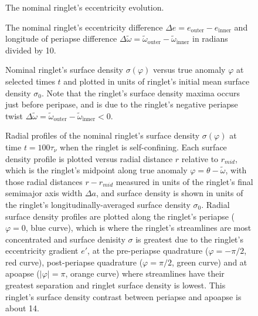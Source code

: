 \documentclass[preprint]{aastex62}
\begin{document}
\begin{figure}
    \caption{
        \label{fig:e_nominal}
        The nominal ringlet's eccentricity evolution.
    }
\end{figure}

\begin{figure}
    \caption{
        \label{fig:de_nominal}
        The nominal ringlet's eccentricity difference $\Delta e = e_{\text{outer}} - e_{\text{inner}}$
        and longitude of periapse difference
        $\Delta\tilde{\omega} = \tilde{\omega}_{\text{outer}} - \tilde{\omega}_{\text{inner}}$
        in radians divided by 10.
    }
\end{figure}

\begin{figure}
    \caption{
        \label{fig:nominal_sigma_vs_longitude}
        Nominal ringlet's surface density $\sigma(\varphi)$ versus true anomaly 
        $\varphi$ at selected times $t$ and plotted in units of ringlet's initial
        mean surface density $\sigma_0$. Note that the ringlet's surface
        density maxima occurs just before peripase,  and is due to the ringlet's
        negative periapse twist 
        $\Delta\tilde{\omega} = \tilde{\omega}_{\text{outer}} - \tilde{\omega}_{\text{inner}} < 0$.
    }
\end{figure}

\begin{figure}
    \caption{
        \label{fig:radial_sigma_nominal}
        Radial profiles of the nominal ringlet's surface density $\sigma(\varphi)$ at time $t=100\tau_\nu$
        when the ringlet is self-confining. Each surface density profile is plotted versus radial distance $r$ 
        relative to $r_{mid}$, which is the ringlet's midpoint along true anomaly $\varphi = \theta-\tilde{\omega}$,
        with those radial distances $r - r_{mid}$ measured in units of the ringlet's final semimajor axis width $\Delta a$,
        and surface density is shown in units of the ringlet's longitudinally-averaged surface density $\sigma_0$.
        Radial surface density profiles are plotted along the ringlet's periapse ($\varphi=0$, blue curve), which is 
        where the ringlet's streamlines are most concentrated and surface denisity $\sigma$ is
        greatest due to the ringlet's eccentricity gradient $e'$, at the pre-periapse
        quadrature ($\varphi=-\pi/2$, red curve), post-periapse
        quadrature ($\varphi=\pi/2$, green curve)
        and at apoapse ($|\varphi|=\pi$, orange curve) where streamlines have their greatest separation
        and ringlet surface density is lowest. This ringlet's surface density contrast between periapse and
        apoapse is about 14.
    }
\end{figure}
\end{document}
